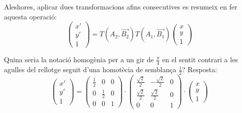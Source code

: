 \documentclass{beamer}
\begin{document}
\begin{frame}
  Aleshores, aplicar dues transformacions afins consecutives es resumeix en fer aquesta operació:
  \[
    \begin{pmatrix}x'\\y'\\1\end{pmatrix} = T(A_2,\overrightarrow{B_2}) T(A_1,\overrightarrow{B_1}) \begin{pmatrix}x\\y\\1\end{pmatrix}
  \]
  \begin{exercici}{}
    Quina seria la notació homogènia per a un gir de $\frac{\pi}{4}$ en el sentit contrari a les agulles del rellotge seguit d'una homotècia de semblança $\frac{1}{2}$? Resposta:
  \[
      \begin{pmatrix}x'\\y'\\1\end{pmatrix}=
      \begin{pmatrix}\frac{1}{2}&0&0\\0&\frac{1}{2}&0\\0&0&1\end{pmatrix} \cdot
      \begin{pmatrix}\frac{\sqrt{2}}{2}&-\frac{\sqrt{2}}{2}&0\\\frac{\sqrt{2}}{2}&\frac{\sqrt{2}}{2}&0\\0&0&1\end{pmatrix} \cdot
      \begin{pmatrix}x\\y\\1\end{pmatrix}
  \]
  \end{exercici}
\end{frame}
\end{document}
